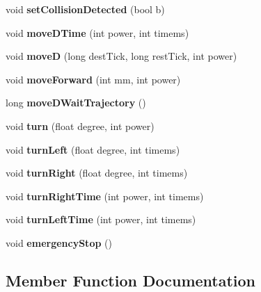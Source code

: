 \begin{DoxyCompactItemize}
\mbox{\label{classMovingBase_a0dd3ea4c7fa6db172b7122ec4e7e5b28}} 
void {\bfseries set\+Collision\+Detected} (bool b)
\item 
\mbox{\label{classMovingBase_ac36cc4f5d65c50b9153302339ee9b802}} 
void {\bfseries move\+D\+Time} (int power, int timems)
\item 
\mbox{\label{classMovingBase_aa587c972ff3bf7705f3c4185f0734ac8}} 
void {\bfseries moveD} (long dest\+Tick, long rest\+Tick, int power)
\item 
\mbox{\label{classMovingBase_adba6458b714b929325713a7340dc8bf9}} 
void {\bfseries move\+Forward} (int mm, int power)
\item 
\mbox{\label{classMovingBase_a444358e692427c026701cf59bf3e8a77}} 
long {\bfseries move\+D\+Wait\+Trajectory} ()
\item 
\mbox{\label{classMovingBase_afdf7dd720729e8f10229fef61b7e46dc}} 
void {\bfseries turn} (float degree, int power)
\item 
\mbox{\label{classMovingBase_a5084950fa5169836b8146a62a9573a45}} 
void {\bfseries turn\+Left} (float degree, int timems)
\item 
\mbox{\label{classMovingBase_ab73f920df2d980884cc8df3588df87b4}} 
void {\bfseries turn\+Right} (float degree, int timems)
\item 
\mbox{\label{classMovingBase_aa1742cc702751bbcdc07c51c0a9cdd69}} 
void {\bfseries turn\+Right\+Time} (int power, int timems)
\item 
\mbox{\label{classMovingBase_adf5e9e74d21fe0007dc93cf1e185bcc5}} 
void {\bfseries turn\+Left\+Time} (int power, int timems)
\item 
\mbox{\label{classMovingBase_a2ce723ff9eef4fc60f122ab9745edd53}} 
void {\bfseries emergency\+Stop} ()
\end{DoxyCompactItemize}


\subsection{Member Function Documentation}
\mbox{\label{classMovingBase_ab5c7ea25f16c77159ead52e565a80eef}} 
